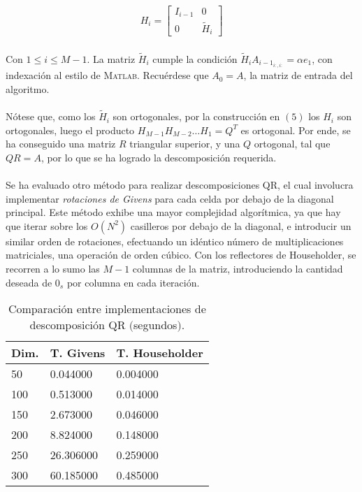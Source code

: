 \documentclass[12pt, twocolumn]{article}
\begin{document}
	\begin{align}
	H_{i} = \begin{bmatrix} 
	I_{i-1} & 0 	   \\
	0 	   & \widetilde{H}_{i}         
	\end{bmatrix}
	\end{align}
	
	
	\paragraph{} Con $1 \le i \le M-1$. La matriz $\widetilde{H}_{i}$ cumple la condición $\widetilde{H}_{i}A_{i-1_{i:,i:}} = \alpha e_{1}$, con indexación al estilo de \textsc{Matlab}. Recuérdese que $A_{0} = A$, la matriz de entrada del algoritmo.
	
	\paragraph{} Nótese que, como los $\widetilde{H}_{i}$ son ortogonales, por la construcción en $(5)$ los $H_{i}$ son ortogonales, luego el producto $H_{M-1}H_{M-2}\dots H_{1} = Q^{T}$ es ortogonal. Por ende, se ha conseguido una matriz $R$ triangular superior, y una $Q$ ortogonal, tal que $QR = A$, por lo que se ha logrado la descomposición requerida. 
	
	\paragraph{} Se ha evaluado otro método para realizar descomposiciones QR, el cual involucra implementar \textit{rotaciones de Givens} para cada celda por debajo de la diagonal principal. Este método exhibe una mayor complejidad algorítmica, ya que hay que iterar sobre los $O(N^{2})$ casilleros por debajo de la diagonal, e introducir un similar orden de rotaciones, efectuando un idéntico número de multiplicaciones matriciales, una operación de orden cúbico. Con los reflectores de Householder, se recorren a lo sumo las $M-1$ columnas de la matriz, introduciendo la cantidad deseada de $0_{s}$ por columna en cada iteración.
	
	\begin{table}[]
		\centering
		\label{qrcmp}
		\begin{tabular}{@{}lll@{}}
			\toprule
			Dim. & T. Givens & T. Householder \\ \midrule
			50        & 0.044000  & 0.004000       \\
			100       & 0.513000  & 0.014000       \\
			150       & 2.673000  & 0.046000       \\
			200       & 8.824000  & 0.148000       \\
			250       & 26.306000 & 0.259000       \\
			300       & 60.185000 & 0.485000       \\ \bottomrule
		\end{tabular}
		\caption{Comparación entre implementaciones de descomposición QR $($segundos$)$.}
	\end{table}
	
\end{document}
